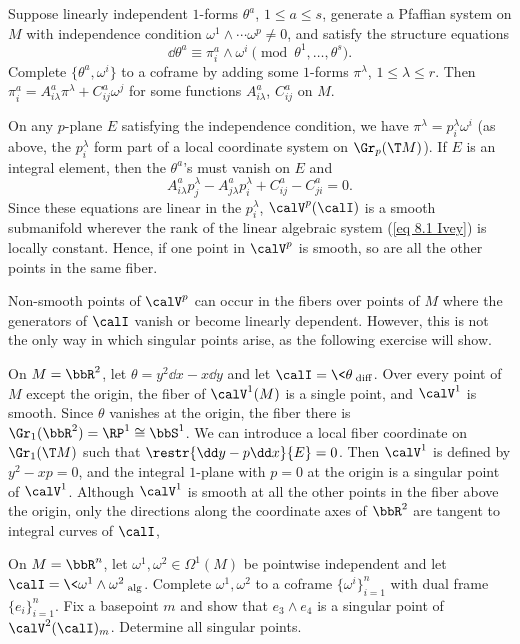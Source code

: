 \begin{example}
    Suppose linearly independent $1$-forms $\theta^a$, $1\leq a\leq s$, generate a Pfaffian system on $M$ with independence condition $\omega^1\wedge\cdots\omega^p\neq 0$, and satisfy the structure equations 
    \[\dd\theta^a\equiv \pi^a_i\wedge\omega^i\pmod{\theta^1,\ldots,\theta^s}.\]
    Complete $\{\theta^a,\omega^i\}$ to a coframe by adding some $1$-forms $\pi^\lambda$, $1\leq\lambda\leq r$. Then $\pi^a_i=A^a_{i\lambda}\pi^\lambda+C^a_{ij}\omega^j$ for some functions $A^a_{i\lambda}$, $C^a_{ij}$ on $M$.

    On any $p$-plane $E$ satisfying the independence condition, we have $\pi^\lambda=p^\lambda_i\omega^i$ (as above, the $p^\lambda_i$ form part of a local coordinate system on $\Gr_p(\T M)$). If $E$ is an integral element, then the $\theta^a$'s must vanish on $E$ and 
    \[A^a_{i\lambda}p^\lambda_j-A^a_{j\lambda}p^\lambda_i+C^a_{ij}-C^a_{ji}=0.\label{eq 8.1 Ivey}\]
    Since these equations are linear in the $p^\lambda_i$, $\calV^p(\calI)$ is a smooth submanifold wherever the rank of the linear algebraic system (\ref{eq 8.1 Ivey}) is locally constant. Hence, if one point in $\calV^p$ is smooth, so are all the other points in the same fiber.
\end{example}


Non-smooth points of $\calV^p$ can occur in the fibers over points of $M$ where the generators of $\calI$ vanish or become linearly dependent. However, this is not the only way in which singular points arise, as the following exercise will show.


\begin{example}
    On $M=\bbR^2$, let $\theta=y^2\dd x-x\dd y$ and let $\calI=\<\theta\>_{\mathrm{diff}}$. Over every point of $M$ except the origin, the fiber of $\calV^1(M)$ is a single point, and $\calV^1$ is smooth. Since $\theta$ vanishes at the origin, the fiber there is $\Gr_1(\bbR^2)=\RP^1\cong \bbS^1$. We can introduce a local fiber coordinate on $\Gr_1(\T M)$ such that $\restr{\dd y-p\dd x}{E}=0$. Then $\calV^1$ is defined by $y^2-xp=0$, and the integral $1$-plane with $p=0$ at the origin is a singular point of $\calV^1$. Although $\calV^1$ is smooth at all the other points in the fiber above the origin, only the directions along the coordinate axes of $\bbR^2$ are tangent to integral curves of $\calI$,
\end{example}


\begin{example}
    On $M=\bbR^n$, let $\omega^1,\omega^2\in\Omega^1(M)$ be pointwise independent and let $\calI=\<\omega^1\wedge\omega^2\>_{\mathrm{alg}}$. Complete $\omega^1,\omega^2$ to a coframe $\{\omega^i\}_{i=1}^n$ with dual frame $\{e_i\}_{i=1}^n$. Fix a basepoint $m$ and show that $e_3\wedge e_4$ is a singular point of $\calV^2(\calI)_m$. Determine all singular points.
\end{example}

